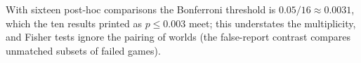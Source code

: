  With sixteen post-hoc comparisons the Bonferroni threshold is $0.05/16 \approx 0.0031$, which the ten results printed as $p \le 0.003$ meet; this understates the multiplicity, and Fisher tests ignore the pairing of worlds (the false-report contrast compares unmatched subsets of failed games).
